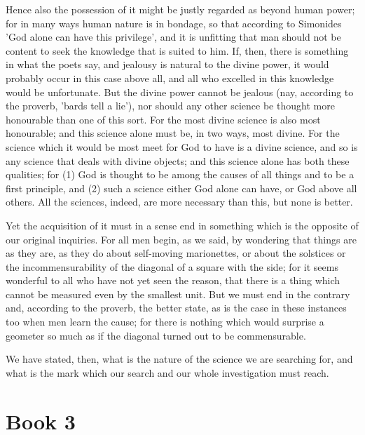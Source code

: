 \documentclass[oneside, 17pt, dvipsnames]{extbook}
\begin{document}
Hence also the possession of it might be justly regarded as beyond human power; for in many ways human nature is in bondage, so that according to Simonides 'God alone can have this privilege', and it is unfitting that man should not be content to seek the knowledge that is suited to him. If, then, there is something in what the poets say, and jealousy is natural to the divine power, it would probably occur in this case above all, and all who excelled in this knowledge would be unfortunate. But the divine power cannot be jealous (nay, according to the proverb, 'bards tell a lie'), nor should any other science be thought more honourable than one of this sort. For the most divine science is also most honourable; and this science alone must be, in two ways, most divine. For the science which it would be most meet for God to have is a divine science, and so is any science that deals with divine objects; and this science alone has both these qualities; for (1) God is thought to be among the causes of all things and to be a first principle, and (2) such a science either God alone can have, or God above all others. All the sciences, indeed, are more necessary than this, but none is better.

Yet the acquisition of it must in a sense end in something which is the opposite of our original inquiries. For all men begin, as we said, by wondering that things are as they are, as they do about self-moving marionettes, or about the solstices or the incommensurability of the diagonal of a square with the side; for it seems wonderful to all who have not yet seen the reason, that there is a thing which cannot be measured even by the smallest unit. But we must end in the contrary and, according to the proverb, the better state, as is the case in these instances too when men learn the cause; for there is nothing which would surprise a geometer so much as if the diagonal turned out to be commensurable.

We have stated, then, what is the nature of the science we are searching for, and what is the mark which our search and our whole investigation must reach.





\newpage
\section{Book 3}
\end{document}
